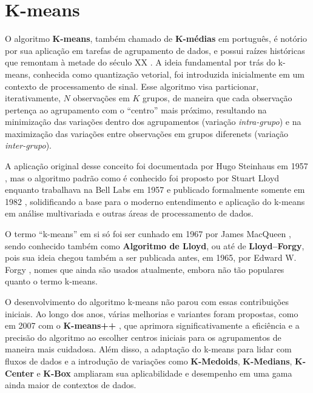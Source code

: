 \documentclass[12pt,
openright, 
oneside, %
a4paper,    %
brazil]{facom-ufu-abntex2}
\begin{document}

\section{K-means}
\label{sec:kMeans}

O algoritmo \textbf{K-means}, também chamado de \textbf{K-médias} em português, é notório por sua aplicação em tarefas de agrupamento de dados, e possui raízes históricas que remontam à metade do século XX \cite{kMeansHistoryBock2007}. A ideia fundamental por trás do k-means, conhecida como quantização vetorial, foi introduzida inicialmente em um contexto de processamento de sinal. Esse algoritmo visa particionar, iterativamente, $N$ observações em $K$ grupos, de maneira que cada observação pertença ao agrupamento com o \enquote{centro} mais próximo, resultando na minimização das variações dentro dos agrupamentos (variação \textit{intra-grupo}) e na maximização das variações entre observações em grupos diferenets (variação \textit{inter-grupo}).

A aplicação original desse conceito foi documentada por Hugo Steinhaus em 1957 \cite{kMeansFirstIdeaSteinhaus1957}, mas o algoritmo padrão como é conhecido foi proposto por Stuart Lloyd enquanto trabalhava na Bell Labs em 1957 e publicado formalmente somente em 1982 \cite{kMeansFirstAlgoLloyd1982}, solidificando a base para o moderno entendimento e aplicação do k-means em análise multivariada e outras áreas de processamento de dados.

O termo \enquote{k-means} em si só foi ser cunhado em 1967 por James MacQueen \cite{kMeansCoinedMacQueen1967}, sendo conhecido também como \textbf{Algoritmo de Lloyd}, ou até de \textbf{Lloyd--Forgy}, pois sua ideia chegou também a ser publicada antes, em 1965, por Edward W. Forgy \cite{kMeansFirst2AlgoForgy1965}, nomes que ainda são usados atualmente, embora não tão populares quanto o termo k-means.

O desenvolvimento do algoritmo k-means não parou com essas contribuições iniciais. Ao longo dos anos, várias melhorias e variantes foram propostas, como em 2007 com o \textbf{K-means++} \cite{kMeansPlusPlus2007}, que aprimora significativamente a eficiência e a precisão do algoritmo ao escolher centros iniciais para os agrupamentos de maneira mais cuidadosa. Além disso, a adaptação do k-means para lidar com fluxos de dados e a introdução de variações como \textbf{K-Medoids}, \textbf{K-Medians}, \textbf{K-Center} e \textbf{K-Box} ampliaram sua aplicabilidade e desempenho em uma gama ainda maior de contextos de dados.
\end{document}
